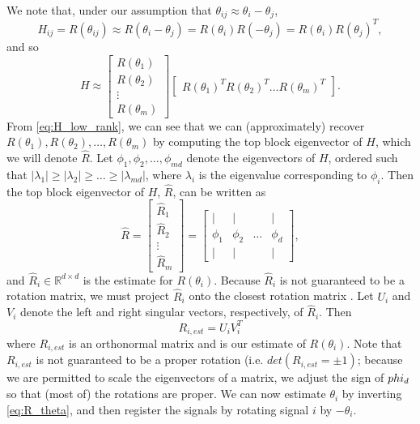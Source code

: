 \documentclass{pnastwo}
\begin{document}
\begin{article}
\begin{materials}
We note that, under our assumption that $\theta_{ij} \approx \theta_i - \theta_j$, 
\begin{equation} 
H_{ij} = R(\theta_{ij}) \approx R(\theta_i - \theta_j) = R(\theta_i) R(-\theta_j) = R(\theta_i) R(\theta_j)^T,
\end{equation}
 and so
\begin{equation} \label{eq:H_low_rank}
	H \approx 
	\begin{bmatrix}
	R(\theta_1) \\
	R(\theta_2) \\
	\vdots \\
	R(\theta_m)
	\end{bmatrix}
	\begin{bmatrix}
	R(\theta_1)^T R(\theta_2)^T \dots R(\theta_m)^T
	\end{bmatrix}.
\end{equation}
%
From \eqref{eq:H_low_rank}, we can see that we can (approximately) recover $R(\theta_1), R(\theta_2), \dots, R(\theta_m)$ by computing the top block eigenvector of $H$, which we will denote $\hat{R}$.
%
Let $\phi_1, \phi_2, \dots, \phi_{md}$ denote the eigenvectors of $H$, ordered such that $|\lambda_1| \ge |\lambda_2| \ge \dots \ge |\lambda_{md}|$, where $\lambda_i$ is the eigenvalue corresponding to $\phi_i$. 
%
Then the top block eigenvector of $H$, $\hat{R}$, can be written as
\begin{equation}
\hat{R} = 
\begin{bmatrix}
\hat{R}_1 \\
\hat{R}_2 \\
\vdots \\
\hat{R}_m
\end{bmatrix} =
\begin{bmatrix}
| & | & & | \\
\phi_1 & \phi_2 & \dots & \phi_d \\
| & | & & | 
\end{bmatrix},
\end{equation}
and $\hat{R}_i \in \mathbb{R}^{d \times d}$ is the estimate for $R(\theta_i)$. 
%
Because $\hat{R}_i$ is not guaranteed to be a rotation matrix, we must project $\hat{R}_i$ onto the closest rotation matrix \cite{...}. 
%
Let $U_i$ and $V_i$ denote the left and right singular vectors, respectively, of $\hat{R}_i$.
%
Then
\begin{equation}
R_{i, est} = U_i V_i^T
\end{equation} 
where $R_{i, est}$ is an orthonormal matrix and is our estimate of $R(\theta_i)$. 
%
Note that $R_{i, est}$ is not guaranteed to be a proper rotation (i.e. $det(R_{i, est} = \pm 1)$; because we are permitted to scale the eigenvectors of a matrix, we adjust the sign of $\\phi_d$ so that (most of) the rotations are proper. 
%
We can now estimate $\theta_{i}$ by inverting \eqref{eq:R_theta}, and then register the signals by rotating signal $i$ by $-\theta_i$. 


\end{materials}
\end{article}
\end{document}
